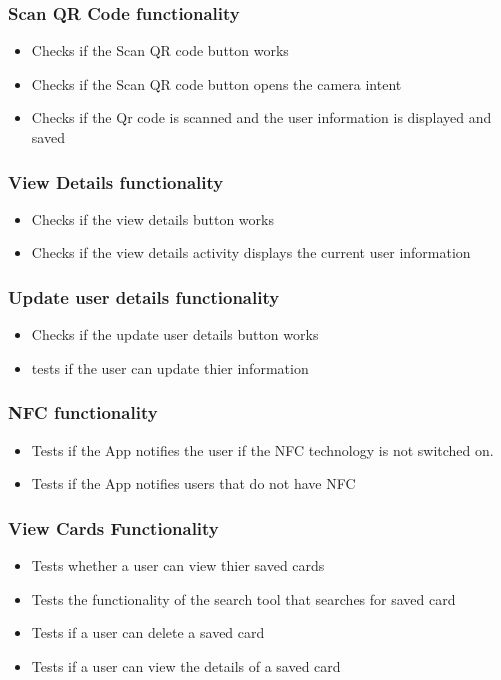 \documentclass[english]{article}
\begin{document}
	\subsubsection{Scan QR Code functionality}
			\begin{itemize} 
				\item Checks if the Scan QR code button works
				\item Checks if the Scan QR code button opens the camera intent
				\item Checks if the Qr code is scanned and the user information is displayed and saved
			\end{itemize}
		\subsubsection{View Details functionality}
			\begin{itemize} 
				\item Checks if the view details button works
				\item Checks if the view details activity displays the current user information
			\end{itemize}
		\subsubsection{Update user details functionality}
			\begin{itemize} 
				\item Checks if the update user details button works
				\item tests if the user can update thier information
			\end{itemize}
		\subsubsection{NFC functionality}
		\begin{itemize} 
			\item Tests if the App notifies the user if the NFC technology is not switched on.
			\item Tests if the App notifies users that do not have NFC
			
		\end{itemize}
		\subsubsection{View Cards Functionality}
		\begin{itemize}
			\item Tests whether a user can view thier saved cards
			\item Tests the functionality of the search tool that searches for saved card
			\item Tests if a user can delete a saved card
			\item Tests if a user can view the details of a saved card
		\end{itemize}
\end{document}
